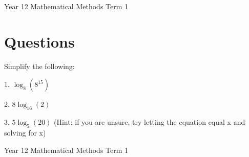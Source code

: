 \documentclass[12pt]{article}
\begin{document}
\vfill %
\flushleft

\newpage %

\noindent Year 12 Mathematical Methods \hfill Term 1


\section*{Questions}
Simplify the following: \vspace{10pt}

\noindent \vspace{10pt} 1. $\log_8(8^{15})$ \vspace{25pt}
\noindent \makebox[\linewidth]{\dotfill}
\vspace{25pt}
\noindent \makebox[\linewidth]{\dotfill}
\vspace{25pt}
\noindent \makebox[\linewidth]{\dotfill} 
\vspace{10pt}


\noindent \vspace{10pt} 2. $8\log_{16}(2)$ \vspace{20pt}
\noindent \makebox[\linewidth]{\dotfill}
\vspace{25pt}
\noindent \makebox[\linewidth]{\dotfill}
\vspace{25pt}
\noindent \makebox[\linewidth]{\dotfill} 
\vspace{10pt}

\noindent \vspace{10pt} 3. $5\log_{5}(20)$ (Hint: if you are unsure, try letting the equation equal x and solving for x) \vspace{25pt}
\noindent \makebox[\linewidth]{\dotfill}
\vspace{25pt}
\noindent \makebox[\linewidth]{\dotfill}
\vspace{25pt}
\noindent \makebox[\linewidth]{\dotfill}
\vspace{25pt}
\noindent \makebox[\linewidth]{\dotfill} 
\vspace{10pt}

\vfill %
\flushleft


\newpage %

\noindent Year 12 Mathematical Methods \hfill Term 1
\end{document}
